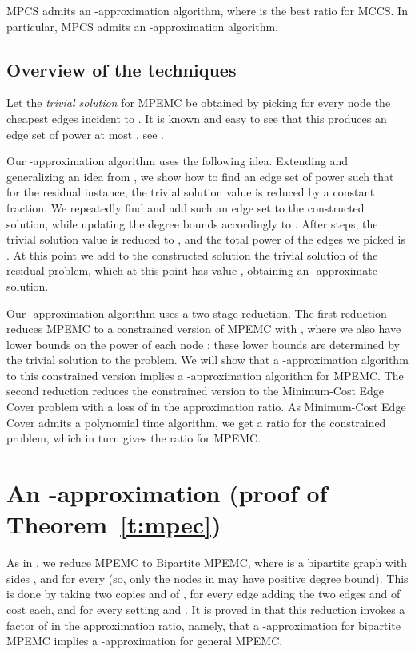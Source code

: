 \documentclass{llncs}
\begin{document}
\begin{theorem} \label{c:mpkc}
{\sf MPCS} admits an -approximation algorithm,
where  is the best ratio for {\sf MCCS}. 
In particular, {\sf MPCS} admits an -approximation algorithm.
\end{theorem}

\subsection{Overview of the techniques}

Let the {\em trivial solution} for {\sf MPEMC} be obtained by picking for every 
node  the cheapest  edges incident to .
It is known and easy to see that this produces an edge set of power at most 
, see \cite{HKMN}. 

Our -approximation algorithm uses the following idea.
Extending and generalizing an idea from \cite{KMNT},
we show how to find an edge set  of power 
such that for the residual instance, 
the trivial solution value is reduced by a constant fraction.
We repeatedly find and add such an edge set  to the constructed solution, 
while updating the degree bounds accordingly to .
After  steps, the trivial solution value is reduced to , 
and the total power of the edges we picked is .
At this point we add to the constructed solution the trivial solution of the residual problem,
which at this point has value , obtaining an -approximate solution.

Our -approximation algorithm uses a two-stage reduction.
The first reduction reduces {\sf MPEMC} to a constrained version of {\sf MPEMC} 
with , where we also have lower bounds  on the power 
of each node ; these lower bounds are determined by the trivial solution
to the problem. We will show that a -approximation 
algorithm to this constrained version implies a -approximation
algorithm for {\sf MPEMC}. The second reduction reduces the constrained version 
to the {\sf Minimum-Cost Edge Cover} problem with a loss of  in the 
approximation ratio. As {\sf Minimum-Cost Edge Cover} admits a polynomial time algorithm, 
we get a ratio  for the constrained problem,
which in turn gives the ratio  for {\sf MPEMC}.

\section{An -approximation (proof of Theorem~\ref{t:mpec})}

As in \cite{KMNT}, we reduce {\sf MPEMC} to {\sf Bipartite MPEMC},
where  is a bipartite graph with sides , and  for every  
(so, only the nodes in  may have positive degree bound).
This is done by taking two copies  and  of ,
for every edge  adding the two edges  and  of cost  each,
and for every  setting  and .
It is proved in \cite{KMNT} that this reduction invokes a factor of  in the
approximation ratio, namely, that a -approximation for bipartite {\sf MPEMC} 
implies a -approximation for general {\sf MPEMC}.
\end{document}
